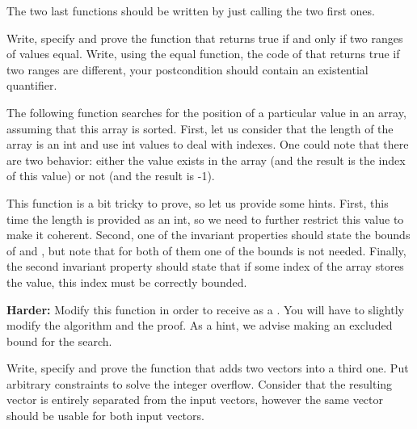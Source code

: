 The two last functions should be written by just calling the two first ones.




Write, specify and prove the function  that returns true if
and only if two ranges of values equal. Write, using the equal function, the
code of  that returns true if two ranges are different,
your postcondition should contain an existential quantifier.




\label{l4:statements-loops-ex-bsearch}

The following function searches for the position of a particular value in an
array, assuming that this array is sorted. First, let us consider that the
length of the array is an int and use int values to deal with indexes. One
could note that there are two behavior: either the value exists in the array
(and the result is the index of this value) or not (and the result is -1).




This function is a bit tricky to prove, so let us provide some hints. First,
this time the length is provided as an int, so we need to further restrict
this value to make it coherent. Second, one of the invariant properties
should state the bounds of  and , but note
that for both of them one of the bounds is not needed. Finally, the second
invariant property should state that if some index of the array stores the
value, this index must be correctly bounded.


\textbf{Harder:} Modify this function in order to receive 
as a . You will have to slightly modify the algorithm
and the proof. As a hint, we advise making  an excluded
bound for the search.




Write, specify and prove the function that adds two vectors into a third
one. Put arbitrary constraints to solve the integer overflow. Consider that
the resulting vector is entirely separated from the input vectors, however
the same vector should be usable for both input vectors.






